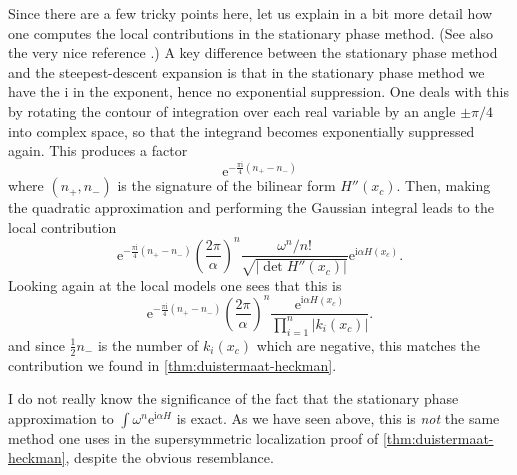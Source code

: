 \documentclass[12pt,letterpaper,reqno]{article}
\numberwithin{equation}{section}
\newcommand{\half}{\ensuremath{\frac{1}{2}}}
\newcommand{\I}{{\mathrm i}}
\newcommand{\e}{{\mathrm e}}
\newcommand{\abs}[1]{\lvert#1\rvert}
\newcommand{\ti}[1]{\textit{#1}}
\begin{document}
Since there are a few tricky points here, let us explain 
in a bit more detail how one computes the local contributions 
in the stationary phase method. (See also the very
nice reference \cite{MR85e:58041}.)
A key difference between the stationary phase method and
the steepest-descent expansion is that in the stationary phase 
method we have the
$\I$ in the exponent, hence no exponential suppression. 
One deals with this by rotating the contour of
integration over each real variable by an angle $\pm \pi/4$
into complex space, so that the integrand
becomes exponentially suppressed again.
This produces a factor
\begin{equation}
  \e^{-\frac{\pi \I}{4} (n_+ - n_-)}
\end{equation}
where $(n_+,n_-)$ is the signature of 
the bilinear form $H''(x_c)$.
Then, making the quadratic approximation and performing the Gaussian integral 
leads to the local contribution
\begin{equation}
  \e^{-\frac{\pi \I}{4} (n_+ - n_-)} \left( \frac{2 \pi}{\alpha} \right)^n
\frac{\omega^n/n!}{\sqrt{\abs{\det H''(x_c)}}} \e^{\I \alpha H(x_c)}.
\end{equation}
Looking again at the local models one sees that this is
\begin{equation}
  \e^{-\frac{\pi \I}{4} (n_+ - n_-)} \left( \frac{2 \pi}{\alpha} \right)^n
\frac{\e^{\I \alpha H(x_c)}}{\prod_{i=1}^n \abs{k_i(x_c)}}.
\end{equation}
and since $\half n_-$ is the number of $k_i(x_c)$ which are negative, this
matches the contribution we found in \autoref{thm:duistermaat-heckman}.

I do not really know the significance of the fact that 
the stationary phase
approximation to $\int \omega^n \e^{\I \alpha H}$ 
is exact. As we have seen above, this is \ti{not}
the same method one uses in the supersymmetric localization proof
of \autoref{thm:duistermaat-heckman}, despite the obvious resemblance.

\end{document}
